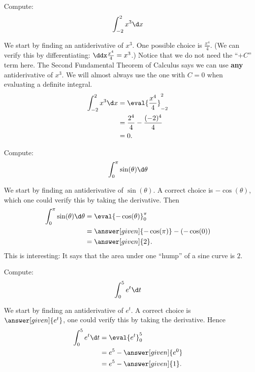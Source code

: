 \documentclass{ximera}
\begin{document}
\begin{example}
  Compute:
  \[
  \int_{-2}^2 x^3\d x
  \]
  \begin{explanation}
    We start by finding an antiderivative of $x^3$.  One possible choice is $\frac{x^{4}}{4}$. (We can verify this by differentiating: 
    $\ddx \frac{x^4}{4} = x^3$.) Notice that we do not need the ``$+C$'' term here. The Second Fundamental Theorem of Calculus says
    we can use \textbf{any} antiderivative of $x^3$. We will almost always use the one with $C=0$ when
    evaluating a definite integral.
    \begin{align*}
      \int_{-2}^2 x^3 \d x &=\eval{\frac{x^4}{4}}_{-2}^2\\
      &= \frac{2^4}{4} - \frac{(-2)^4}{4}\\
      &= 0.
    \end{align*}
  \end{explanation}
\end{example}


\begin{example}
	  Compute:
	  \[ \int_0^\pi \sin(\theta) \d \theta \]
	  \begin{explanation}
		    We start by finding an antiderivative of $\sin(\theta)$.  A correct choice is $-\cos(\theta)$, which one could verify this by taking the
		    derivative. Then
		    \begin{align*}
			      \int_0^\pi \sin(\theta) \d \theta &= \eval{-\cos(\theta)}_0^\pi\\
				      &=\answer[given]{-\cos(\pi)} - (-\cos(0))\\
				      &=\answer[given]{2}.
		    \end{align*}
		    This is interesting: It says that the area under one ``hump'' of a sine curve is $2$.
	  \end{explanation}
\end{example}

\begin{example}
  Compute:
  \[
  \int_0^5 e^t\d t
  \]
  \begin{explanation}
    We start by finding an antiderivative of $e^t$.  A correct choice
    is $\answer[given]{e^t}$, one could verify this by taking the
    derivative. Hence
    \begin{align*}
      \int_0^5 e^t \d t &= \eval{e^t}_0^5 \\
      &= e^5-\answer[given]{e^0}\\
      &= e^5-\answer[given]{1}.
    \end{align*}
  \end{explanation}
\end{example}
\end{document}
